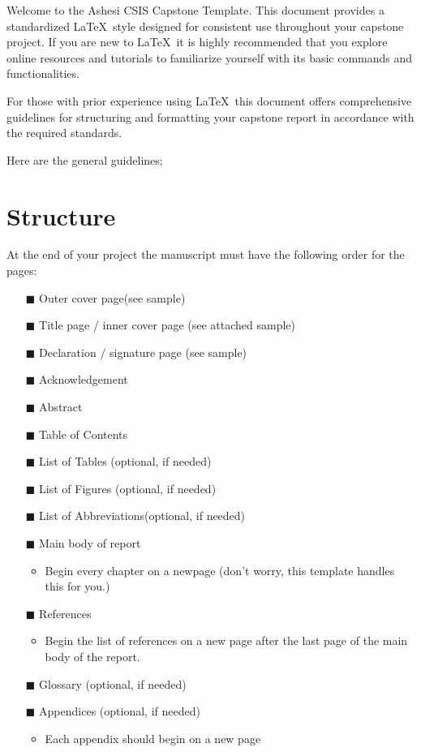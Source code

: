 Welcome to the Ashesi CSIS Capstone Template. This document provides a standardized \LaTeX\ style designed for consistent use throughout your capstone project. If you are new to \LaTeX\, it is highly recommended that you explore online resources and tutorials to familiarize yourself with its basic commands and functionalities.

For those with prior experience using \LaTeX\, this document offers comprehensive guidelines for structuring and formatting your capstone report in accordance with the required standards.

Here are the general guidelines;

\section{Structure}
At the end of your project the manuscript must have the following order for the pages:
\begin{itemize}
    \item[$\blacksquare$] Outer cover page(see sample)
    \item[$\blacksquare$]  Title page / inner cover page (see attached sample)
    \item[$\blacksquare$]  Declaration / signature page (see sample)
    \item[$\blacksquare$] Acknowledgement
    \item[$\blacksquare$] Abstract
    \item[$\blacksquare$] Table of Contents
    \item[$\blacksquare$] List of Tables (optional, if needed)
    \item[$\blacksquare$] List of Figures (optional, if needed)
    \item[$\blacksquare$]  List of Abbreviations(optional, if needed)
    \item[$\blacksquare$] Main body of report
        \begin{itemize}
            \item Begin every chapter on a newpage (don't worry, this template handles this for you.)
        \end{itemize}
    \item[$\blacksquare$] References 
        \begin{itemize}
            \item Begin the list of references on a new page after the last page of the main body of the report.
        \end{itemize}
    \item[$\blacksquare$] Glossary (optional, if needed)
    \item[$\blacksquare$] Appendices (optional, if needed)
        \begin{itemize}
            \item Each appendix should begin on a new page
        \end{itemize}
    
    
\end{itemize}

